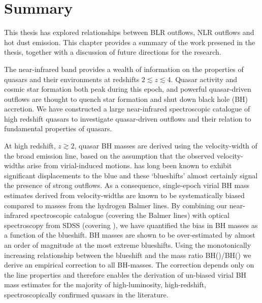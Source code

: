 
\chapter{Summary}
\label{ch:summary} 


This thesis has explored relationships between BLR outflows, NLR outflows and hot dust emission. 
This chapter provides a summary of the work presened in the thesis, together with a discussion of future directions for the research. 

The near-infrared band provides a wealth of information on the properties of quasars and their environments at redshifts $2 \lesssim z \lesssim 4$. 
Quasar activity and cosmic star formation both peak during this epoch, and powerful quasar-driven outflows are thought to quench star formation and shut down black hole (BH) accretion. 
We have constructed a large near-infrared spectroscopic catalogue of high redshift quasars to investigate quasar-driven outflows and their relation to fundamental properties of quasars. 

At high redshift, $z \gtrsim 2$, quasar BH masses are derived using the velocity-width of the  broad emission line, based on the assumption that the observed velocity-widths arise from virial-induced motions.  
 has long been known to exhibit significant displacements to the blue and these `blueshifts' almost certainly signal the presence of strong outflows.
As a consequence, single-epoch virial BH mass estimates derived from  velocity-widths are known to be systematically biased compared to masses from the hydrogen Balmer lines.
By combining our near-infrared spectroscopic catalogue (covering the Balmer lines) with optical spectroscopy from SDSS (covering ), we have quantified the bias in  BH masses as a function of the  blueshift. 
 BH masses are shown to be over-estimated by almost an order of magnitude at the most extreme blueshifts.
Using the monotonically increasing relationship between the  blueshift and the mass ratio BH()/BH(\hans) we derive an empirical correction to all  BH-masses.
The correction depends only on the  line properties and therefore enables the derivation of un-biased virial BH mass estimates for the majority of high-luminosity, high-redshift, spectroscopically confirmed quasars in the literature. 

